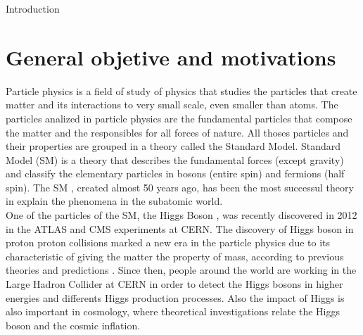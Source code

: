 \renewcommand{\baselinestretch}{1.5}

\begin{chapter}{Introduction}

\section{General objetive and motivations}

Particle physics is a field of study of physics that studies the particles that create matter and its interactions to very small scale, even smaller than atoms. The particles analized in particle physics are the fundamental particles that compose the matter and the responsibles for all forces of nature. All thoses particles  and their properties are grouped in a theory called the Standard Model. Standard Model (SM) is a theory that describes the fundamental forces (except gravity) and classify the elementary particles in bosons (entire spin) and fermions (half spin).
The SM , created almost 50 years ago, has been the most successul theory in explain the phenomena in the subatomic world.
\\

One of the particles of the SM, the Higgs Boson , was recently discovered in 2012 in the ATLAS and CMS experiments at CERN. The discovery of Higgs boson in  proton proton collisions  marked a new era in the particle physics due to its characteristic  of giving the matter the property of mass, according to previous theories and predictions . Since then, people around the world are working in the Large Hadron Collider at CERN  in order to detect the Higgs bosons in higher energies and differents Higgs production processes. 
Also the impact of Higgs is also  important in cosmology,  where theoretical investigations relate the Higgs boson and the cosmic inflation.\\


\end{chapter}
